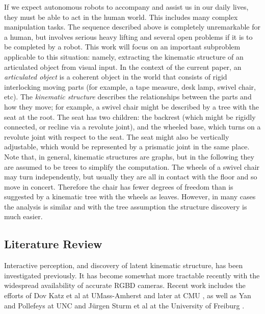 \documentclass[letterpaper, 10 pt, conference]{ieeeconf}  %
\begin{document}
If we expect autonomous robots to accompany and assist us in our daily lives, they must be able to act in the human world. This includes many complex manipulation tasks. The sequence described above is completely unremarkable for a human, but involves serious heavy lifting and several open problems if it is to be completed by a robot. This work will focus on an important subproblem applicable to this situation: namely, extracting the kinematic structure of an articulated object from visual input. In the context of the current paper, an \emph{articulated object} is a coherent object in the world that consists of rigid interlocking moving parts (for example, a tape measure, desk lamp, swivel chair, etc). The \emph{kinematic structure} describes the relationships between the parts and how they move; for example, a swivel chair might be described by a tree with the seat at the root. The seat has two children: the backrest (which might be rigidly connected, or recline via a revolute joint), and the wheeled base, which turns on a revolute joint with respect to the seat. The seat might also be vertically adjustable, which would be represented by a prismatic joint in the same place. Note that, in general, kinematic structures are graphs, but in the following they are assumed to be trees to simplify the computation. The wheels of a swivel chair may turn independently, but usually they are all in contact with the floor and so move in concert. Therefore the chair has fewer degrees of freedom than is suggested by a kinematic tree with the wheels as leaves. However, in many cases the analysis is similar and with the tree assumption the structure discovery is much easier.

\subsection{Literature Review}
Interactive perception, and discovery of latent kinematic structure, has been investigated previously. It has become somewhat more tractable recently with the widespread availability of accurate RGBD cameras. Recent work includes the efforts of Dov Katz et al at UMass-Amherst \cite{Katz2008,Katz2008a} and later at CMU \cite{Katz2012}, as well as Yan and Pollefeys at UNC \cite{Yan2006} and J\"{u}rgen Sturm et al at the University of Freiburg \cite{Sturm2011}.
\end{document}
